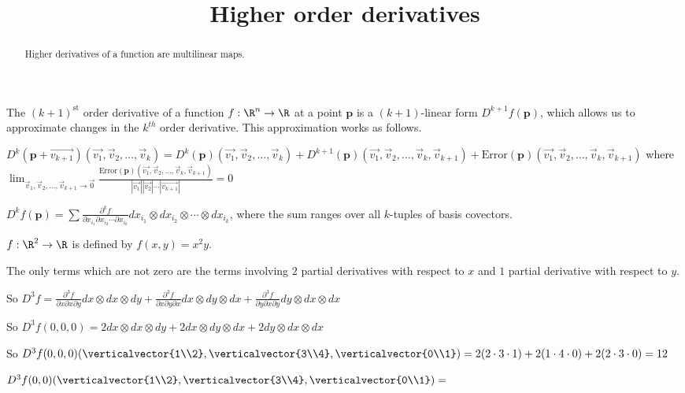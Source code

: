 \documentclass{ximera}
\title{Higher order derivatives}
\begin{document}
\begin{abstract}
  Higher derivatives of a function are multilinear maps.
\end{abstract}

The $(k+1)^{\text{st}}$ order derivative of a function $f: \R^n \to \R$  at a point $\mathbf{p}$ is a $(k+1)$-linear form  $D^{k+1} f(\mathbf{p})$,
which allows us to approximate changes in the $k^{th}$ order derivative.  This approximation works as follows.

\begin{definition}
  $D^k(\mathbf{p} + \vec{v_{k+1}})(\vec{v_1},\vec{v}_2,\ldots,\vec{v}_k)  = 
  D^k(\mathbf{p})(\vec{v_1},\vec{v}_2,\ldots,\vec{v}_k) + D^{k+1}(\mathbf{p})(\vec{v_1},\vec{v}_2,\ldots,\vec{v}_k,\vec{v}_{k+1})+ 
  \textrm{Error}(\mathbf{p})(\vec{v_1},\vec{v}_2,\ldots,\vec{v}_k,\vec{v}_{k+1})$ where 
  \(
  \displaystyle\lim_{\vec{v}_1,\vec{v}_2,\ldots,\vec{v}_{k+1} \to \vec{0} } 
  \frac{\textrm{Error}(\mathbf{p})(\vec{v_1},\vec{v}_2,\ldots,\vec{v}_k,\vec{v}_{k+1})}{|\vec{v_1}||\vec{v_2}|\cdots|\vec{v_{k+1}}|} = 0
  \)
\end{definition}

\begin{theorem}
  $D^kf(\mathbf{p}) = \sum \frac{\partial^kf}{\partial x_{i_1} \partial x_{i_2} \cdots \partial x_{i_k}} dx_{i_1} \otimes dx_{i_2} \otimes \cdots \otimes dx_{i_k}$, where the sum ranges 
  over all $k$-tuples of basis covectors.
\end{theorem}

\begin{question}
  $f:\R^2 \to \R$ is defined by $f(x,y) = x^2y$.  
  \begin{solution}
    \begin{hint}
      The only terms which are not zero are the terms involving $2$ partial derivatives with respect to $x$ and $1$ partial derivative with respect to $y$.
    \end{hint}
    \begin{hint}
      So $D^3f = \frac{\partial ^3 f}{\partial x \partial x \partial y} dx \otimes dx \otimes dy+ \frac{\partial ^3 f}{\partial x \partial y \partial x} dx \otimes dy \otimes dx+ \frac{\partial ^3 f}{\partial y \partial x \partial y} dy \otimes dx \otimes dx$
    \end{hint}
    \begin{hint}
      So $D^3f(0,0,0) = 2 dx\otimes dx \otimes dy+ 2 dx\otimes dy \otimes dx+2 dy\otimes dx \otimes dx$
    \end{hint}
    \begin{hint}
      So $D^3f(0,0,0)(\verticalvector{1\\2},\verticalvector{3\\4},\verticalvector{0\\1}) =2( 2 \cdot 3 \cdot 1)+2( 1 \cdot 4 \cdot 0)+2(2 \cdot 3 \cdot 0) = 12$
    \end{hint}
    $D^3f(0,0)(\verticalvector{1\\2},\verticalvector{3\\4},\verticalvector{0\\1})=$
  \end{solution}
\end{question}
\end{document}
